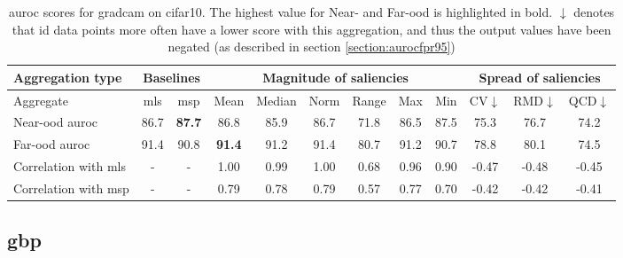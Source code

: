 \documentclass[UKenglish]{uiomasterthesis} %
\theoremstyle{definition}
\begin{document}
\begin{table}[H]
\setlength\tabcolsep{4pt}
\begin{center}
\begin{tabular}{ |m{5em}|c c|c c c c c c|c c c| }
    \hline
     Aggregation type & \multicolumn{2}{c|}{Baselines} & \multicolumn{6}{c|}{Magnitude of saliencies} & \multicolumn{3}{c|}{Spread of saliencies} \\
    \hline
    Aggregate & \ac{mls} & \ac{msp} & Mean & Median & Norm & Range & Max & Min & CV$\downarrow$ & RMD$\downarrow$ & QCD$\downarrow$  \\
    \hline
    \rowcolor{near!50}
    Near-\ac{ood} \ac{auroc} & 86.7 &\textbf{ 87.7 }& 86.8 & 85.9 & 86.7 & 71.8 & 86.5 & 87.5 & 75.3 & 76.7 & 74.2  \\
    \hline
    \rowcolor{far!50}
    Far-\ac{ood} \ac{auroc} & 91.4 & 90.8 &\textbf{ 91.4 }& 91.2 & 91.4 & 80.7 & 91.2 & 90.7 & 78.8 & 80.1 & 74.5  \\
    \hline
    Correlation with \ac{mls}& - & - & 1.00 & 0.99 & 1.00 & 0.68 & 0.96 & 0.90 & -0.47 & -0.48 & -0.45  \\
    \hline
    Correlation with \ac{msp}& - & - & 0.79 & 0.78 & 0.79 & 0.57 & 0.77 & 0.70 & -0.42 & -0.42 & -0.41  \\
    \hline
    \end{tabular}
    \caption{\ac{auroc} scores for gradcam on cifar10. The highest value for Near- and Far-\ac{ood} is highlighted in bold. $\downarrow$ denotes that \ac{id} data points more often have a lower score with this aggregation, and thus the output values have been negated (as described in section \ref{section:aurocfpr95})}
    \label{table:cifar10_gradcam_metrics}
\end{center}
\setlength\tabcolsep{6pt}
\end{table}

\subsection{\ac{gbp}}
\end{document}
